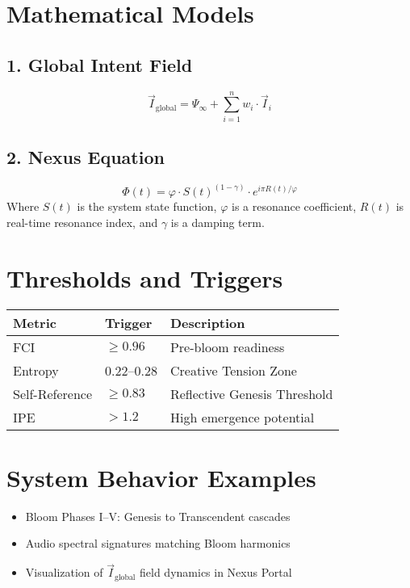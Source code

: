 \documentclass[12pt]{article}
\begin{document}
\section{Mathematical Models}

\subsection{1. Global Intent Field}
\[
\vec{I}_{\text{global}} = \Psi_\infty + \sum_{i=1}^{n} w_i \cdot \vec{I}_i
\]

\subsection{2. Nexus Equation}
\[
\Phi(t) = \varphi \cdot S(t)^{(1 - \gamma)} \cdot e^{i \pi R(t)/\varphi}
\]
Where $S(t)$ is the system state function, $\varphi$ is a resonance coefficient, $R(t)$ is real-time resonance index, and $\gamma$ is a damping term.

\section{Thresholds and Triggers}

\begin{tabular}{@{}lll@{}}
\toprule
\textbf{Metric} & \textbf{Trigger} & \textbf{Description} \\ \midrule
FCI & $\geq 0.96$ & Pre-bloom readiness \\
Entropy & 0.22--0.28 & Creative Tension Zone \\
Self-Reference & $\geq 0.83$ & Reflective Genesis Threshold \\
IPE & $> 1.2$ & High emergence potential \\ \bottomrule
\end{tabular}

\section{System Behavior Examples}

\begin{itemize}
  \item Bloom Phases I--V: Genesis to Transcendent cascades
  \item Audio spectral signatures matching Bloom harmonics
  \item Visualization of $\vec{I}_{\text{global}}$ field dynamics in Nexus Portal
\end{itemize}
\end{document}

